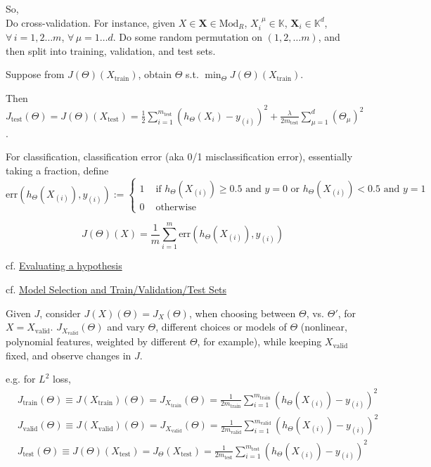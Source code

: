 \documentclass[10pt]{amsart}
\begin{document}
\begin{multicols*}{2}
So, \\

Do cross-validation.  For instance, given $X \in \mathbf{X} \in \text{Mod}_{R}$, $X_i^{ \  \  \mu } \in \mathbb{K}$, $\mathbf{X}_i \in \mathbb{K}^d$, \, $\forall \, i =1,2\dots m$, $\forall \, \mu =1\dots d$.  Do some random permutation on $(1,2,\dots m)$, and then split into training, validation, and test sets.  

Suppose from $J(\Theta)(X_{\text{train}})$, obtain $\Theta$ s.t. $\min_{\Theta} J(\Theta)(X_{\text{train}})$.  

Then $J_{\text{test}}(\Theta) = J(\Theta)(X_{\text{test}}) = \frac{1}{2} \sum_{i=1}^{m_{\text{test}}} (h_{\Theta}(X_i) - y_{(i)} )^2 + \frac{\lambda}{2m_{\text{test}}} \sum_{\mu=1}^d (\Theta_{\mu})^2 $.  

For classification, classification error (aka 0/1 misclassification error), essentially taking a fraction, define
\begin{equation}
	\text{err}(h_{\Theta}(X_{(i)} ), y_{(i)} ) := \begin{cases} 1 & \text{ if } h_{\Theta}(X_{(i)} ) \geq 0.5 \text{ and } y=0 \text{ or } h_{\Theta}(X_{(i)}) < 0.5 \text{ and } y=1 \\ 
0 & \text{ otherwise } \end{cases}
\end{equation}

\[
J(\Theta)(X) = \frac{1}{m} \sum_{i=1}^m \text{err}(h_{\Theta}(X_{(i)}), y_{(i)} )
\]


cf. \href{https://www.coursera.org/learn/machine-learning/supplement/aFpD3/evaluating-a-hypothesis}{Evaluating a hypothesis}

cf. \href{https://www.coursera.org/learn/machine-learning/lecture/QGKbr/model-selection-and-train-validation-test-sets}{Model Selection and Train/Validation/Test Sets}

Given $J$, consider $J(X)(\Theta) = J_X(\Theta)$, when choosing between $\Theta$, vs. $\Theta'$, for $X=X_{\text{valid}}$.  $J_{X_{\text{valid}}}(\Theta)$ and vary $\Theta$, different choices or models of $\Theta$ (nonlinear, polynomial features, weighted by different $\Theta$, for example), while keeping $X_{\text{valid}}$ fixed, and observe changes in $J$.  

e.g. for $L^2$ loss, 
\[
\begin{aligned}
	& J_{\text{train}}(\Theta) \equiv  J(X_{\text{train}})(\Theta) = J_{X_{\text{train}}}(\Theta) = \frac{1}{2m_{\text{train}}} \sum_{i=1}^{m_{\text{train}} } (h_{\Theta}(X_{(i)}) -y_{(i)} )^2 \\ 
	& J_{\text{valid}}(\Theta) \equiv  J(X_{\text{valid}})(\Theta) = J_{X_{\text{valid}}}(\Theta) = \frac{1}{2m_{\text{valid}}} \sum_{i=1}^{m_{\text{valid}} } (h_{\Theta}(X_{(i)}) -y_{(i)} )^2 \\
	& J_{\text{test}}(\Theta) \equiv  J(\Theta)(X_{\text{test}}) = J_{\Theta}(X_{\text{test}}) = \frac{1}{2m_{\text{test}}} \sum_{i=1}^{m_{\text{test}} } (h_{\Theta}(X_{(i)}) -y_{(i)} )^2 
\end{aligned}
\]


\end{multicols*}
\end{document}
